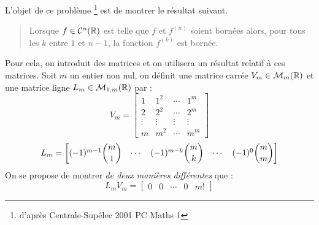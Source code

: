 L'objet de ce problème \footnote{d'après Centrale-Supélec 2001 PC Maths 1} est de montrer le résultat suivant.
\begin{quote}
 Lorsque $f\in\mathcal C^n(\mathbb{R})$ est telle que $f$ et $f^{(n)}$ soient bornées alors, pour tous les $k$ entre $1$ et $n-1$, la fonction $f^{(k)}$ est bornée.
\end{quote}
Pour cela, on introduit des matrices et on utilisera un résultat relatif à ces matrices.\newline
Soit $m$ un entier non nul, on définit une matrice carrée $V_m\in \mathcal M_m(\mathbb{R})$  et une matrice ligne $L_m\in\mathcal M_{1,m}(\mathbb{R})$ par :
\begin{displaymath}
 V_m = 
\begin{bmatrix}
 1 & 1^2 & \cdots & 1^m \\
 2 & 2^2 & \cdots & 2^m \\
 \vdots & \vdots & \vdots & \vdots \\
 m & m^2 & \cdots & m^m
\end{bmatrix}
\end{displaymath}
\begin{displaymath}
L_m =
\begin{bmatrix}
 (-1)^{m-1}\dbinom{m}{1} & \cdots & (-1)^{m-k}\dbinom{m}{k} & \cdots & (-1)^0\dbinom{m}{m}
\end{bmatrix} 
\end{displaymath}
On se propose de montrer \emph{de deux manières différentes }que :
\begin{displaymath}
 L_m V_m =
\begin{bmatrix}
 0 & 0 & \cdots & 0 & m!
\end{bmatrix}
\end{displaymath}

